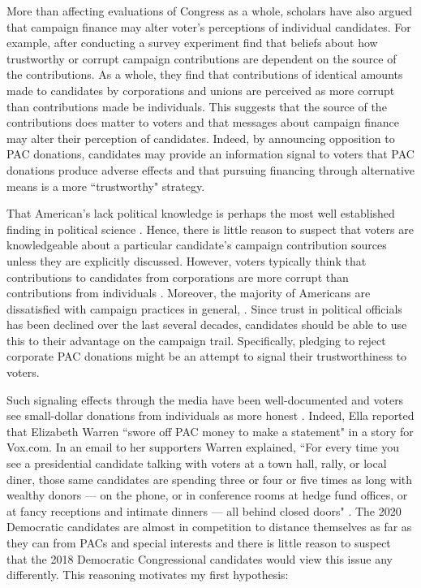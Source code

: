 \documentclass[12pt]{article}
\begin{document}
 More than affecting evaluations of Congress as a whole, scholars have also argued that campaign finance may alter voter's perceptions of individual candidates. For example, after conducting a survey experiment \citet{bowler2016} find that beliefs about how trustworthy or corrupt campaign contributions are dependent on the source of the contributions. As a whole, they find that contributions of identical amounts made to candidates by corporations and unions are perceived as more corrupt than contributions made be individuals. This suggests that the source of the contributions does matter to voters and that messages about campaign finance may alter their perception of candidates. Indeed, by announcing opposition to PAC donations, candidates may provide an information signal to voters that PAC donations produce adverse effects and that pursuing financing through alternative means is a more ``trustworthy" strategy.
 
 That American's lack political knowledge is perhaps the most well established finding in political science \citep{page1992, carpini1997}. Hence, there is little reason to suspect that voters are knowledgeable about a particular candidate's campaign contribution sources unless they are explicitly discussed. However, voters typically think that contributions to candidates from corporations are more corrupt than contributions from individuals \citep{bowler2016}. Moreover, the majority of Americans are dissatisfied with campaign practices in general, \citep{mayer2001, persily2004}. Since trust in political officials has been declined over the last several decades, candidates should be able to use this to their advantage on the campaign trail. Specifically, pledging to reject corporate PAC donations might be an attempt to signal their trustworthiness to voters. 
 
 Such signaling effects through the media have been well-documented \citep{iyengar1989} and voters see small-dollar donations from individuals as more honest \citep{bowler2016}. Indeed, Ella \citet{nilsen2019} reported that Elizabeth Warren ``swore off PAC money to make a statement" in a story for Vox.com. In an email to her supporters Warren explained, ``For every time you see a presidential candidate talking with voters at a town hall, rally, or local diner, those same candidates are spending three or four or five times as long with wealthy donors — on the phone, or in conference rooms at hedge fund offices, or at fancy receptions and intimate dinners — all behind closed doors" \citep{nilsen2019}. The 2020 Democratic candidates are almost in competition to distance themselves as far as they can from PACs and special interests and there is little reason to suspect that the 2018 Democratic Congressional candidates would view this issue any differently. This reasoning motivates my first hypothesis:  
 
\end{document}
